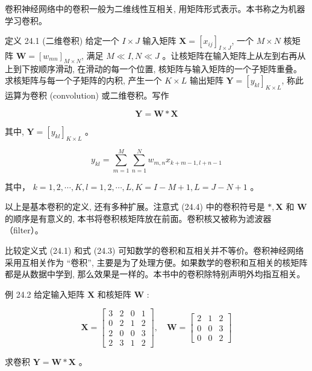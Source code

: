 \documentclass[10pt]{article}
\begin{document}
\begin{CJK*}{UTF8}{bsmi}
卷积神经网络中的卷积一般为二维线性互相关, 用矩阵形式表示。本书称之为机器学习卷积。

定义 24.1 (二维卷积) 给定一个 $I \times J$ 输入矩阵 $\boldsymbol{X}=\left[x_{i j}\right]_{I \times J}$, 一个 $M \times N$ 核矩阵 $\boldsymbol{W}=\left[w_{m n}\right]_{M \times N}$, 满足 $M \ll I, N \ll J$ 。让核矩阵在输入矩阵上从左到右再从上到下按顺序滑动, 在滑动的每一个位置, 核矩阵与输入矩阵的一个子矩阵重叠。求核矩阵与每一个子矩阵的内积, 产生一个 $K \times L$ 输出矩阵 $\boldsymbol{Y}=\left[y_{k l}\right]_{K \times L}$, 称此运算为卷积 (convolution) 或二维卷积。写作


\begin{equation*}
\boldsymbol{Y}=\boldsymbol{W} * \boldsymbol{X} \tag{24.4}
\end{equation*}


其中, $\boldsymbol{Y}=\left[y_{k l}\right]_{K \times L}$ 。


\begin{equation*}
y_{k l}=\sum_{m=1}^{M} \sum_{n=1}^{N} w_{m, n} x_{k+m-1, l+n-1} \tag{24.5}
\end{equation*}


其中， $k=1,2, \cdots, K, l=1,2, \cdots, L, K=I-M+1, L=J-N+1$ 。

以上是基本卷积的定义, 还有多种扩展。注意式 (24.4) 中的卷积符号是 $*, \boldsymbol{X}$ 和 $\boldsymbol{W}$ 的顺序是有意义的, 本书将卷积核矩阵放在前面。卷积核又被称为滤波器（filter）。

比较定义式 (24.1) 和式 (24.3) 可知数学的卷积和互相关并不等价。卷积神经网络采用互相关作为 “卷积”, 主要是为了处理方便。如果数学的卷积和互相关的核矩阵都是从数据中学到, 那么效果是一样的。本书中的卷积除特别声明外均指互相关。

例 24.2 给定输入矩阵 $\boldsymbol{X}$ 和核矩阵 $\boldsymbol{W}$ :

$$
\boldsymbol{X}=\left[\begin{array}{cccc}
3 & 2 & 0 & 1 \\
0 & 2 & 1 & 2 \\
2 & 0 & 0 & 3 \\
2 & 3 & 1 & 2
\end{array}\right], \quad \boldsymbol{W}=\left[\begin{array}{ccc}
2 & 1 & 2 \\
0 & 0 & 3 \\
0 & 0 & 2
\end{array}\right]
$$

求卷积 $\boldsymbol{Y}=\boldsymbol{W} * \boldsymbol{X}$ 。


\end{CJK*}
\end{document}
